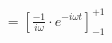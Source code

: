 \documentclass[preview]{standalone}
\begin{document}
\begin{align*}
&=\left[\frac{-1}{i\omega}\cdot e^{-i\omega t}\right]_{-1}^{+1} \\
\end{align*}
\end{document}
